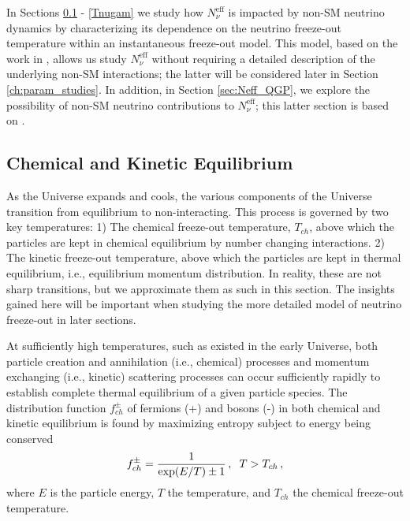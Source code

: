 In Sections \ref{EVEq} - \ref{Tnugam} we study how $N^{\text{eff}}_{\nu}$ is impacted by non-SM neutrino dynamics by characterizing its dependence on the neutrino freeze-out temperature within an instantaneous freeze-out model.  This model, based on the work in \cite{Birrell:2013gpa,Birrell:2012gg}, allows us study $N^{\text{eff}}_{\nu}$ without  requiring a detailed description of the underlying  non-SM interactions; the latter will be considered later in Section \ref{ch:param_studies}.   In addition, in Section  \ref{sec:Neff_QGP}, we explore the possibility of non-SM neutrino contributions to $N^{\text{eff}}_\nu$; this latter section is based on \cite{Birrell:2014cja}.






\subsection{Chemical and Kinetic Equilibrium }\label{EVEq}

As the Universe expands and cools, the various components of the Universe transition  from equilibrium to non-interacting. This process is governed by two key temperatures: 1) The chemical freeze-out temperature, $T_{ch}$, above which the particles are kept in chemical  equilibrium by number changing interactions. 2) The  kinetic freeze-out temperature, above which the particles are kept in thermal equilibrium, i.e., equilibrium momentum distribution.  In reality, these are not sharp transitions, but we approximate them as such in this section.  The insights gained here will be important when studying the more detailed model of neutrino freeze-out in later sections.



At sufficiently high temperatures, such as existed in the early Universe, both particle creation and annihilation (i.e., chemical) processes and momentum exchanging (i.e., kinetic) scattering processes can occur sufficiently rapidly to establish complete thermal equilibrium of a given particle species. The  distribution function $f_{ch}^\pm$ of  fermions (+) and bosons (-) in both chemical and kinetic equilibrium is found by maximizing entropy subject to energy being conserved
\begin{equation}\label{ch_eq}
f_{ch}^\pm=\frac{1}{\exp(E/T)\pm 1}\,, \hspace{2mm} T>T_{ch}\,,
\end{equation}
where $E$ is the particle energy, $T$ the temperature, and $T_{ch}$ the chemical freeze-out temperature. 



